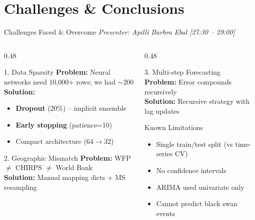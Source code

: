 \documentclass[aspectratio=169,11pt]{beamer}
\begin{document}
\section{Challenges \& Conclusions}

\begin{frame}{Challenges Faced \& Overcome}
\textit{\small Presenter: Apilli Barbra Ebal \hfill [27:30 -- 29:00]}
\begin{columns}
\begin{column}{0.48\textwidth}
\begin{block}{1. Data Sparsity}
\textbf{Problem:} Neural networks need 10,000+ rows; we had $\sim$200\\
\textbf{Solution:}
\begin{itemize}
    \item \textbf{Dropout} (20\%) -- implicit ensemble
    \item \textbf{Early stopping} (patience=10)
    \item Compact architecture (64$\rightarrow$32)
\end{itemize}
\end{block}

\begin{block}{2. Geographic Mismatch}
\textbf{Problem:} WFP $\neq$ CHIRPS $\neq$ World Bank\\
\textbf{Solution:} Manual mapping dicts + MS resampling
\end{block}
\end{column}
\begin{column}{0.48\textwidth}
\begin{block}{3. Multi-step Forecasting}
\textbf{Problem:} Error compounds recursively\\
\textbf{Solution:} Recursive strategy with lag updates
\end{block}

\begin{alertblock}{Known Limitations}
\begin{itemize}
    \item Single train/test split (vs time-series CV)
    \item No confidence intervals
    \item ARIMA used univariate only
    \item Cannot predict black swan events
\end{itemize}
\end{alertblock}
\end{column}
\end{columns}
\end{frame}
\end{document}
